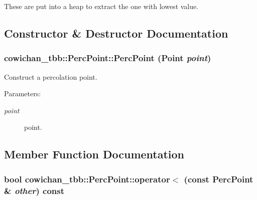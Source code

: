 These are put into a heap to extract the one with lowest value. 

\subsection{Constructor \& Destructor Documentation}
\hypertarget{classcowichan__tbb_1_1_perc_point_6181f073828abb43fd9db668c7954841}{
\subsubsection[{PercPoint}]{\setlength{\rightskip}{0pt plus 5cm}cowichan\_\-tbb::PercPoint::PercPoint ({\bf Point} {\em point})}}
\label{classcowichan__tbb_1_1_perc_point_6181f073828abb43fd9db668c7954841}


Construct a percolation point. \begin{Desc}
\item[Parameters:]
\begin{description}
\item[{\em point}]point. \end{description}
\end{Desc}


\subsection{Member Function Documentation}
\hypertarget{classcowichan__tbb_1_1_perc_point_f8e5cc2f3104c8aaf2183ef21ae78b6d}{
\subsubsection[{operator$<$}]{\setlength{\rightskip}{0pt plus 5cm}bool cowichan\_\-tbb::PercPoint::operator$<$ (const {\bf PercPoint} \& {\em other}) const}}
\label{classcowichan__tbb_1_1_perc_point_f8e5cc2f3104c8aaf2183ef21ae78b6d}


